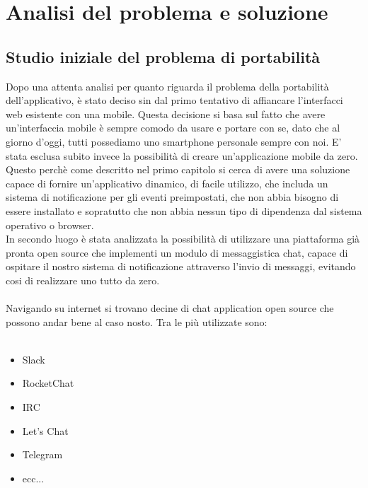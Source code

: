 \section{Analisi del problema e soluzione}


\subsection{Studio iniziale del problema di portabilità}
Dopo una attenta analisi per quanto riguarda il problema della portabilità dell'applicativo, è stato deciso sin dal primo tentativo di affiancare l'interfacci web esistente con una mobile. Questa decisione si basa sul fatto che avere un'interfaccia mobile è sempre comodo da usare e portare con se, dato che al giorno d'oggi, tutti possediamo uno smartphone personale sempre con noi. E' stata esclusa subito invece la possibilità di creare un'applicazione mobile da zero. Questo perchè come descritto nel primo capitolo si cerca di avere una soluzione capace di fornire un'applicativo dinamico, di facile utilizzo, che includa un sistema di notificazione per gli eventi preimpostati, che non abbia bisogno di essere installato e sopratutto che non abbia nessun tipo di dipendenza dal sistema operativo o browser.\\ 
 In secondo luogo è stata analizzata la possibilità di utilizzare una piattaforma già pronta open source che implementi un modulo di messaggistica chat, capace di ospitare il nostro sistema di notificazione attraverso l'invio di messaggi, evitando cosi di realizzare uno tutto da zero.\\\\
Navigando su internet si trovano decine di chat application open source che possono andar bene al caso nosto. Tra le più utilizzate sono: \\\\

\begin{itemize}
\item Slack 
\item RocketChat
\item IRC
\item Let's Chat
\item Telegram 
\item ecc...
\end{itemize}


